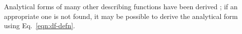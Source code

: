 \documentclass[10pt,openany,twoside]{book}
\numberwithin{equation}{section}   %
\newcommand{\Code}[1]{{\small\tt #1}}
\newcommand{\Fina}{{\normalfont\scshape Fina\:}}
\newcommand{\Sectref}[1]{\S\ref{#1}}
\newcommand{\Eqn}[1]{Eq.\ \ref{#1}}
\begin{document}
Analytical forms of many other describing functions have been 
derived \cite{gelb1968multiple}; if an appropriate one is not
found, it may be possible to derive the analytical form using
\Eqn{eqn:df-defn}.

% 
\end{document}
